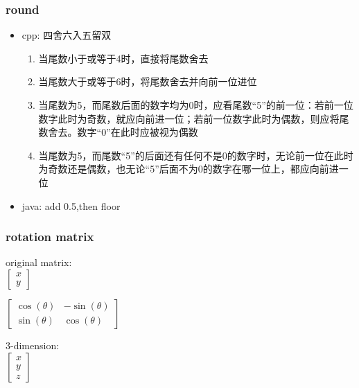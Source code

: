 \subsubsection{round}
\begin{itemize}
\item cpp:  四舍六入五留双
\begin{enumerate}
\item 当尾数小于或等于4时，直接将尾数舍去
\item 当尾数大于或等于6时，将尾数舍去并向前一位进位
\item 当尾数为5，而尾数后面的数字均为0时，应看尾数“5”的前一位：若前一位数字此时为奇数，就应向前进一位；若前一位数字此时为偶数，则应将尾数舍去。数字“0”在此时应被视为偶数
\item 当尾数为5，而尾数“5”的后面还有任何不是0的数字时，无论前一位在此时为奇数还是偶数，也无论“5”后面不为0的数字在哪一位上，都应向前进一位
\end{enumerate}
\item java: add 0.5,then floor
\end{itemize}

\subsubsection{rotation matrix}
original matrix:\\
$\begin{bmatrix}
x\\
y
\end{bmatrix}$

$\begin{bmatrix}
\cos(\theta) & -\sin(\theta) \\
\sin(\theta) & \cos(\theta)
\end{bmatrix}$

3-dimension:\\
$\begin{bmatrix}
x\\
y\\
z
\end{bmatrix}$

